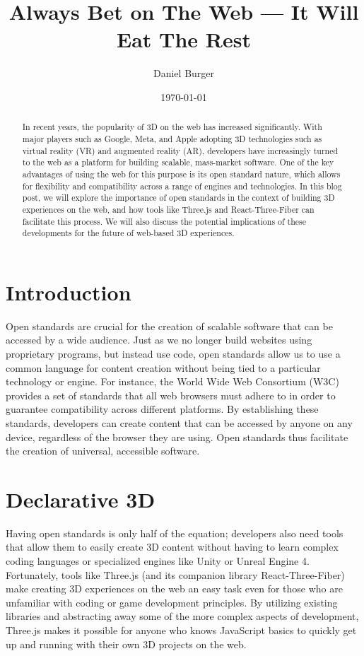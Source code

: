 \documentclass[11pt]{article}
\title{Always Bet on The Web — It Will Eat The Rest}
\author{Daniel Burger}
\date{\today}
\begin{document}
\maketitle
\pagebreak

\begin{abstract}
  In recent years, the popularity of 3D on the web has increased significantly. With major players such as Google, Meta, and Apple adopting 3D technologies such as virtual reality (VR) and augmented reality (AR), developers have increasingly turned to the web as a platform for building scalable, mass-market software. One of the key advantages of using the web for this purpose is its open standard nature, which allows for flexibility and compatibility across a range of engines and technologies. In this blog post, we will explore the importance of open standards in the context of building 3D experiences on the web, and how tools like Three.js and React-Three-Fiber can facilitate this process. We will also discuss the potential implications of these developments for the future of web-based 3D experiences.
\end{abstract}
\pagebreak

\tableofcontents
\pagebreak

\section{Introduction}
\label{sec:introduction}

Open standards are crucial for the creation of scalable software that can be accessed by a wide audience. Just as we no longer build websites using proprietary programs, but instead use code, open standards allow us to use a common language for content creation without being tied to a particular technology or engine. For instance, the World Wide Web Consortium (W3C) provides a set of standards that all web browsers must adhere to in order to guarantee compatibility across different platforms. By establishing these standards, developers can create content that can be accessed by anyone on any device, regardless of the browser they are using. Open standards thus facilitate the creation of universal, accessible software.

\section{Declarative 3D}
\label{sec:declarative-3d}

Having open standards is only half of the equation; developers also need tools that allow them to easily create 3D content without having to learn complex coding languages or specialized engines like Unity or Unreal Engine 4. Fortunately, tools like Three.js (and its companion library React-Three-Fiber) make creating 3D experiences on the web an easy task even for those who are unfamiliar with coding or game development principles. By utilizing existing libraries and abstracting away some of the more complex aspects of development, Three.js makes it possible for anyone who knows JavaScript basics to quickly get up and running with their own 3D projects on the web.
\end{document}
